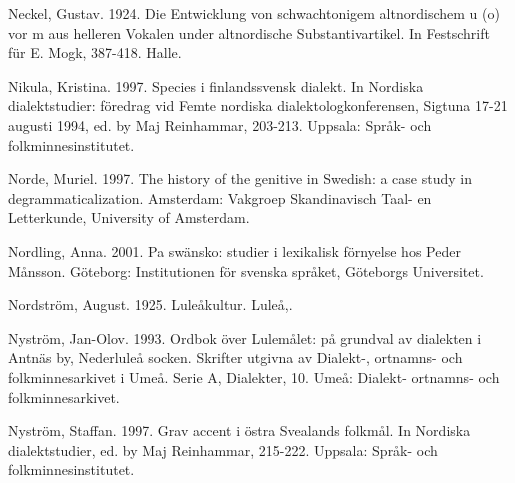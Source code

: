 \begin{styleBodytextC}
Neckel, Gustav. 1924. Die Entwicklung von schwachtonigem altnordischem u (o) vor m aus helleren Vokalen under altnordische Substantivartikel. In Festschrift für E. Mogk, 387-418. Halle.

\end{styleBodytextC}

\begin{styleBodytextC}
Nikula, Kristina. 1997. Species i finlandssvensk dialekt. In Nordiska dialektstudier: föredrag vid Femte nordiska dialektologkonferensen, Sigtuna 17-21 augusti 1994, ed. by Maj Reinhammar, 203-213. Uppsala: Språk- och folkminnesinstitutet.

\end{styleBodytextC}

\begin{styleBodytextC}
Norde, Muriel. 1997. The history of the genitive in Swedish: a case study in degrammaticalization. Amsterdam: Vakgroep Skandinavisch Taal- en Letterkunde, University of Amsterdam.

\end{styleBodytextC}

\begin{styleBodytextC}
Nordling, Anna. 2001. Pa swänsko: studier i lexikalisk förnyelse hos Peder Månsson. Göteborg: Institutionen för svenska språket, Göteborgs Universitet.

\end{styleBodytextC}

\begin{styleBodytextC}
Nordström, August. 1925. Luleåkultur. Luleå,.

\end{styleBodytextC}

\begin{styleBodytextC}
Nyström, Jan-Olov. 1993. Ordbok över Lulemålet: på grundval av dialekten i Antnäs by, Nederluleå socken. Skrifter utgivna av Dialekt-, ortnamns- och folkminnesarkivet i Umeå. Serie A, Dialekter, 10. Umeå: Dialekt- ortnamns- och folkminnesarkivet.

\end{styleBodytextC}

\begin{styleBodytextC}
Nyström, Staffan. 1997. Grav accent i östra Svealands folkmål. In Nordiska dialektstudier, ed. by Maj Reinhammar, 215-222. Uppsala: Språk- och folkminnesinstitutet.

\end{styleBodytextC}

